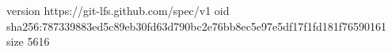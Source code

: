 version https://git-lfs.github.com/spec/v1
oid sha256:787339883ed5c89eb30fd63d790bc2e76bb8ec5e97e5df17f1fd181f76590161
size 5616
